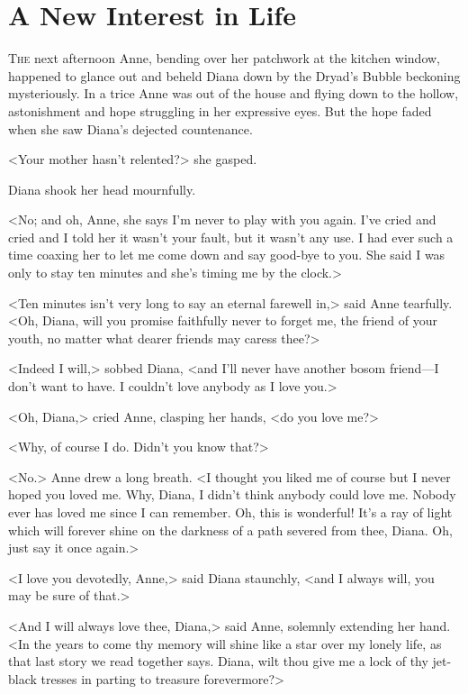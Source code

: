 \chapter{A New Interest in Life}

\lettrine[]{T}{he} next afternoon Anne, bending over her patchwork at the kitchen window, happened to glance out and beheld Diana down by the Dryad's Bubble beckoning mysteriously. In a trice Anne was out of the house and flying down to the hollow, astonishment and hope struggling in her expressive eyes. But the hope faded when she saw Diana's dejected countenance.

<Your mother hasn't relented?> she gasped.

Diana shook her head mournfully.

<No; and oh, Anne, she says I'm never to play with you again. I've cried and cried and I told her it wasn't your fault, but it wasn't any use. I had ever such a time coaxing her to let me come down and say good-bye to you. She said I was only to stay ten minutes and she's timing me by the clock.>

<Ten minutes isn't very long to say an eternal farewell in,> said Anne tearfully. <Oh, Diana, will you promise faithfully never to forget me, the friend of your youth, no matter what dearer friends may caress thee?>

<Indeed I will,> sobbed Diana, <and I'll never have another bosom friend—I don't want to have. I couldn't love anybody as I love you.>

<Oh, Diana,> cried Anne, clasping her hands, <do you love me?>

<Why, of course I do. Didn't you know that?>

<No.> Anne drew a long breath. <I thought you liked me of course but I never hoped you loved me. Why, Diana, I didn't think anybody could love me. Nobody ever has loved me since I can remember. Oh, this is wonderful! It's a ray of light which will forever shine on the darkness of a path severed from thee, Diana. Oh, just say it once again.>

<I love you devotedly, Anne,> said Diana staunchly, <and I always will, you may be sure of that.>

<And I will always love thee, Diana,> said Anne, solemnly extending her hand. <In the years to come thy memory will shine like a star over my lonely life, as that last story we read together says. Diana, wilt thou give me a lock of thy jet-black tresses in parting to treasure forevermore?>

